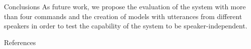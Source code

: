 \documentclass[final]{beamer}
\begin{document}
\begin{frame}{}
\begin{textblock}{39.5}
\begin{block}{Conclusions}
As future work, we propose the evaluation of the system with more than four commands and the creation of models with utterances from different speakers in order to test the capability of the system to be speaker-independent.
\end{block}

\begin{block}{References}
\small

\end{block}

\end{textblock}

\end{frame}
\end{document}
